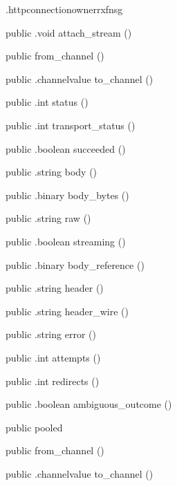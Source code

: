 \begin{CrexxClass}{.httpconnectionowner}{rxfnsg}
\begin{Members}
    \Method
      {public}
      {.void}
      {attach\_stream}
      {()}

    \Factory
      {public}
      {from\_channel}
      {()}

    \Method
      {public}
      {.channelvalue}
      {to\_channel}
      {()}

    \Method
      {public}
      {.int}
      {status}
      {()}

    \Method
      {public}
      {.int}
      {transport\_status}
      {()}

    \Method
      {public}
      {.boolean}
      {succeeded}
      {()}

    \Method
      {public}
      {.string}
      {body}
      {()}

    \Method
      {public}
      {.binary}
      {body\_bytes}
      {()}

    \Method
      {public}
      {.string}
      {raw}
      {()}

    \Method
      {public}
      {.boolean}
      {streaming}
      {()}

    \Method
      {public}
      {.binary}
      {body\_reference}
      {()}

    \Method
      {public}
      {.string}
      {header}
      {()}

    \Method
      {public}
      {.string}
      {header\_wire}
      {()}

    \Method
      {public}
      {.string}
      {error}
      {()}

    \Method
      {public}
      {.int}
      {attempts}
      {()}

    \Method
      {public}
      {.int}
      {redirects}
      {()}

    \Method
      {public}
      {.boolean}
      {ambiguous\_outcome}
      {()}

    \Factory
      {public}
      {pooled}
      {}

    \Factory
      {public}
      {from\_channel}
      {()}

    \Method
      {public}
      {.channelvalue}
      {to\_channel}
      {()}


\end{Members}
\end{CrexxClass}
